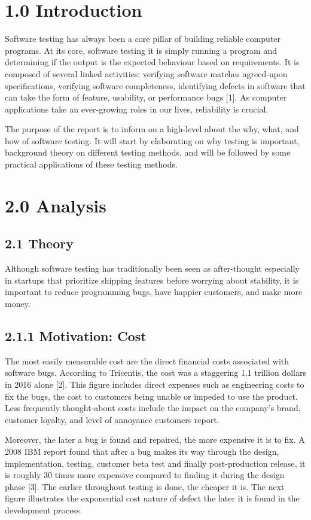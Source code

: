 \documentclass[12pt]{report}
\begin{document}
\section*{1.0 Introduction}
\par\indent
Software testing has always been a core pillar of building reliable computer programs. At its core, software testing it is simply running a program and determining if the output is the expected behaviour based on requirements. It is composed of several linked activities: verifying software matches agreed-upon specifications, verifying software completeness, identifying defects in software that can take the form of feature, usability, or performance bugs [1]. As computer applications take an ever-growing roles in our lives, reliability is crucial. \\ \par\noindent
The purpose of the report is to inform on a high-level about the why, what, and how of software testing. It will start by elaborating on why testing is important, background theory on different testing methods, and will be followed by some practical applications of these testing methods.

\newpage\thispagestyle{fancy}\sectionfont{\scshape}
\section*{2.0 Analysis}
\subsection*{2.1 Theory}
\noindent
 Although software testing has traditionally been seen as after-thought especially in startups that prioritize shipping features before worrying about stability, it is important to reduce programming bugs, have happier customers, and make more money. 
\subsection*{2.1.1 Motivation: Cost}
\par\indent
The most easily measurable cost are the direct financial costs associated with software bugs. According to Tricentis, the cost was a staggering 1.1 trillion dollars in 2016 alone [2]. This figure includes direct expenses such as engineering costs to fix the bugs, the cost to customers being unable or impeded to use the product. Less frequently thought-about costs include the impact on the company's brand, customer loyalty, and level of annoyance customers report. 
\par\noindent
Moreover, the later a bug is found and repaired, the more expensive it is to fix. A 2008 IBM report found that after a bug makes its way through the design, implementation, testing, customer beta test and finally post-production release, it is roughly 30 times more expensive compared to finding it during the design phase [3]. The earlier throughout testing is done, the cheaper it is. The next figure illustrates the exponential cost nature of defect the later it is found in the development process. 
\end{document}
